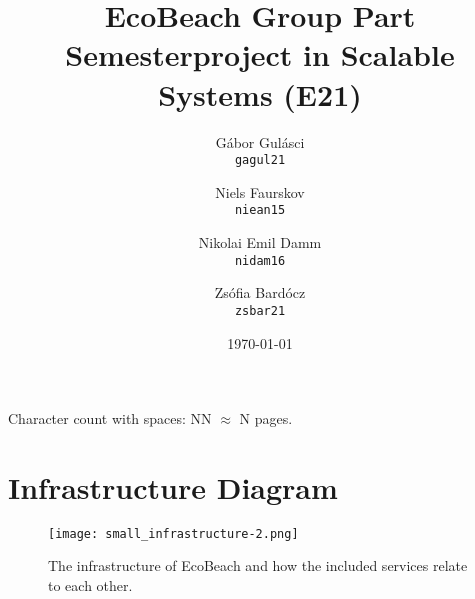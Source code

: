 \documentclass[12pt, oneside, notitlepage]{book}
\title{EcoBeach Group Part \\
    \large Semesterproject in Scalable Systems (E21)}
\author{
    Gábor Gulásci\\
    \texttt{gagul21}
    \and
    Niels Faurskov\\
    \texttt{niean15}
    \and
    Nikolai Emil Damm\\
    \texttt{nidam16}
    \and
    Zsófia Bardócz\\
    \texttt{zsbar21}    
}
\date{\today}
\begin{document}
\begin{titlingpage}
    \maketitle
    \begin{center}
        Character count with spaces: NN $\approx$ N pages.
    \end{center}
\end{titlingpage}
\frontmatter

\tableofcontents

\mainmatter




\printnoidxglossary[type=acronym]
\printbibliography[heading=bibintoc]

\appendix
{}
\chapter{Infrastructure Diagram}\label{ch:infrastructure-diagram}
\begin{figure}[h!]
    \centering
    \texttt{[image: small\_infrastructure-2.png]}
    \caption{The infrastructure of EcoBeach and how the included services relate to each other.}
\end{figure}
\restoregeometry
\end{document}
